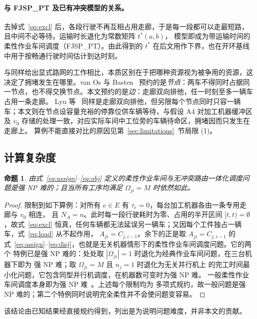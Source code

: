 \documentclass[manuscript,screen,review]{acmart}
\newtheorem{prop}{命题}
\begin{document}
\paragraph{与 FJSP\_PT 及已有冲突模型的关系。}
\label{sec:fjsppt}

去掉式~\eqref{eq:excl} 后，各段行驶不再互相占用走廊，于是每一段都可以走最短路，且中间不必等待。运输时长退化为常数矩阵 $t^{*}(a,b)$，
模型即成为带运输时间的柔性作业车间调度（FJSP\_PT）。由此得到的 $t^{*}$ 在后文用作下界，也在开环基线中用于按畅通行驶时间估计到达时刻。

与同样给出显式路网的工作相比，本质区别在于把哪种资源视为被争用的资源，这决定了拥堵发生在哪里。van Os 与 Basten~\cite{vanos2026exact}
预约的是\emph{节点}：两车不得同时占据同一节点，也不得交换节点。本文预约的是\emph{边}：走廊双向排他，任一时刻至多一辆车占用一条走廊。
Lyu 等~\cite{lyu2019approach} 同样是走廊双向排他，但另限每个节点同时只容一辆车；本文则在节点设容量充裕的停靠位供车辆等待，与假设 A4 对加工机器缓冲区及 $v_0$ 存储的处理一致，对应实际车间中工位旁的车辆待命区，拥堵因而只发生在走廊上。
算例不能直接对比的原因见第~\ref{sec:limitations}~节局限 (1)。

\subsection{计算复杂度}

\begin{prop}
\label{prop:np_hard}
由式~\eqref{eq:assign}--\eqref{eq:obj} 定义的柔性作业车间与无冲突路由一体化调度问题是强 NP 难的；且当所有工序均满足
$\Omega_{ji}=M$ 时依然如此。
\end{prop}

\begin{proof}
限制到如下算例：对所有 $e\in E$ 有 $\tau_e=0$，每台加工机器各由一条专用走廊与 $v_0$ 相连，
且 $N_A=n$。此时每一段行驶耗时为零、占用的半开区间 $[t,t)=\emptyset$，故式~\eqref{eq:excl}
恒真，任何车辆都无法延误另一辆车；又因每个工件独占一辆车，式~\eqref{eq:load} 从不起作用，
$A_{ji}=C_{j,i-1}$。余下的正是取 $A_{ji}=C_{j,i-1}$ 的
式~\eqref{eq:assign}--\eqref{eq:disj}，也就是无关机器情形下的柔性作业车间调度问题。它的两个
特例已是强 NP 难的：处处取 $|\Omega_{ji}|=1$ 时退化为经典作业车间问题，在三台机器下即为
强 NP 难；取 $\Omega_{ji}=M$ 且 $n_j=1$ 时退化为无关并行机上
的完工时间最小化问题，它包含同型并行机调度，在机器数可变时为强 NP 难。
一般柔性作业车间调度本身即为强 NP 难~\cite{dauzereperes2024fjsp}。上述每个限制均为
多项式规约，故一般问题是强 NP 难的；第二个特例同时说明完全柔性并不会使问题变容易。
\end{proof}
该结论由已知结果经直接规约得到，列出是为说明问题难度，并非本文的贡献。
\end{document}

